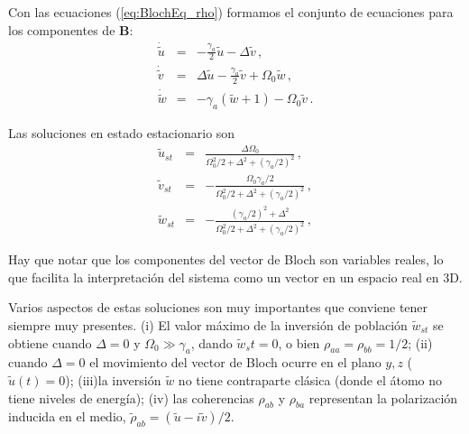 \documentclass[12pt]{report}
\newcommand{\mbB}{\mathbf{B}}
\begin{document}
Con las ecuaciones (\ref{eq:BlochEq_rho}) formamos el conjunto de 
ecuaciones para los componentes de $\mbB$: 
%
\begin{subequations}
\begin{eqnarray}
\dot{\tilde{u}} &=& -\frac{\gamma_a}{2} \tilde{u} - \Delta \tilde{v} \,, \\ 
\dot{\tilde{v}} &=& \Delta \tilde{u} - \frac{\gamma_a}{2} \tilde{v} 
	+\Omega_0 \tilde{w} \,, \\
\dot{\tilde{w}} &=& -\gamma_a (\tilde{w} +1) -\Omega_0 \tilde{v} \,. 
\end{eqnarray}
\end{subequations}

Las soluciones en estado estacionario son
%
\begin{subequations}
\begin{eqnarray}
\tilde{u}_{st} &=& \frac{\Delta \Omega_0}
	{\Omega_0^2/2 +\Delta^2 +(\gamma_a/2)^2 } \,, \\ 
\tilde{v}_{st} &=& -\frac{ \Omega_0 \gamma_a/2}
	{\Omega_0^2/2 +\Delta^2 +(\gamma_a/2)^2 } \,, \\
\tilde{w}_{st} &=& - \frac{(\gamma_a/2)^2 +\Delta^2}
	{\Omega_0^2/2 +\Delta^2 +(\gamma_a/2)^2 }\,, 
\end{eqnarray}
\end{subequations}

Hay que notar que los componentes del vector de Bloch son variables 
reales, lo que facilita la interpretaci\'on del sistema como un vector en 
un espacio real en 3D.

Varios aspectos de estas soluciones son muy importantes que conviene 
tener siempre muy presentes. (i) El valor m\'aximo de la inversi\'on de 
poblaci\'on $\tilde{w}_{st}$ se obtiene cuando $\Delta=0$ y 
$\Omega_0 \gg \gamma_a$, dando $\tilde{w}_st =0$, o bien 
$\rho_{aa} = \rho_{bb} =1/2$; (ii) cuando $\Delta=0$ el movimiento del 
vector de Bloch ocurre en el plano $y,z$ ($\tilde{u}(t)=0$); (iii)la inversi\'on 
$\tilde{w}$ no tiene contraparte cl\'asica (donde el \'atomo no tiene niveles 
de energ\'ia); (iv) las coherencias $\rho_{ab}$ y $\rho_{ba}$ representan 
la polarizaci\'on inducida en el medio, 
$\tilde{\rho}_{ab} = (\tilde{u} -i \tilde{v})/2$.
\end{document}
